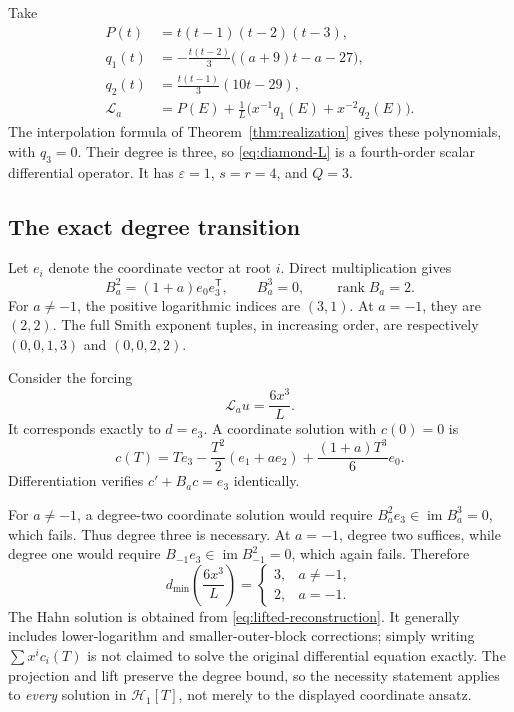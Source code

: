 \documentclass[11pt,a4paper]{article}
\numberwithin{equation}{section}
\theoremstyle{definition}
\theoremstyle{remark}
\theoremstyle{definition}
\newcommand{\Hh}{\mathcal H}
\newcommand{\Ll}{\mathcal L}
\newcommand{\im}{\operatorname{im}}
\newcommand{\rank}{\operatorname{rank}}
\newcommand{\eps}{\varepsilon}
\begin{document}
Take
\begin{align}
 P(t)&=t(t-1)(t-2)(t-3),\label{eq:diamond-P}\\
 q_1(t)&=-\frac{t(t-2)}3\bigl((a+9)t-a-27\bigr),\label{eq:diamond-q1}\\
 q_2(t)&=\frac{t(t-1)}3(10t-29),\label{eq:diamond-q2}\\
 \Ll_a&=P(E)+\frac1L\bigl(x^{-1}q_1(E)+x^{-2}q_2(E)\bigr).
 \label{eq:diamond-L}
\end{align}
The interpolation formula of Theorem~\ref{thm:realization} gives these polynomials, with $q_3=0$. Their degree is three, so \eqref{eq:diamond-L} is a fourth-order scalar differential operator. It has $\eps=1$, $s=r=4$, and $Q=3$.

\subsection{The exact degree transition}
Let $e_i$ denote the coordinate vector at root $i$. Direct multiplication gives
\begin{equation}
 B_a^2=(1+a)e_0e_3^{\mathsf T},\qquad B_a^3=0,
 \qquad\rank B_a=2.
 \label{eq:diamond-powers}
\end{equation}
For $a\ne-1$, the positive logarithmic indices are $(3,1)$. At $a=-1$, they are $(2,2)$. The full Smith exponent tuples, in increasing order, are respectively $(0,0,1,3)$ and $(0,0,2,2)$.

Consider the forcing
\begin{equation}
 \Ll_a u=\frac{6x^3}{L}.
 \label{eq:diamond-forcing}
\end{equation}
It corresponds exactly to $d=e_3$. A coordinate solution with $c(0)=0$ is
\begin{equation}
 c(T)=T e_3-\frac{T^2}{2}(e_1+a e_2)
       +\frac{(1+a)T^3}{6}e_0.
 \label{eq:diamond-c}
\end{equation}
Differentiation verifies $c'+B_ac=e_3$ identically.

For $a\ne-1$, a degree-two coordinate solution would require $B_a^2e_3\in\im B_a^3=0$, which fails. Thus degree three is necessary. At $a=-1$, degree two suffices, while degree one would require $B_{-1}e_3\in\im B_{-1}^2=0$, which again fails. Therefore
\begin{equation}
 d_{\min}\left(\frac{6x^3}{L}\right)=
 \begin{cases}3,&a\ne-1,\\2,&a=-1.
 \end{cases}
 \label{eq:diamond-min}
\end{equation}
The Hahn solution is obtained from \eqref{eq:lifted-reconstruction}. It generally includes lower-logarithm and smaller-outer-block corrections; simply writing $\sum x^ic_i(T)$ is not claimed to solve the original differential equation exactly. The projection and lift preserve the degree bound, so the necessity statement applies to \emph{every} solution in $\Hh_1[T]$, not merely to the displayed coordinate ansatz.
\end{document}
